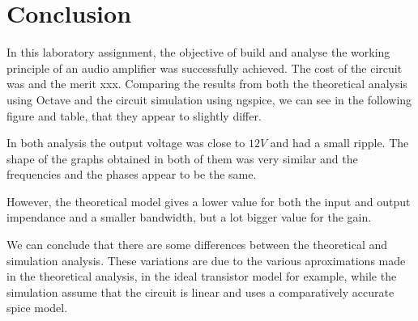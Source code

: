 \section{Conclusion}
\label{sec:conclusion}
In this laboratory assignment, the objective of build and analyse the working principle of an audio amplifier was successfully achieved.
The cost of the circuit was  and the merit xxx.
Comparing the results from both the theoretical analysis using Octave and the circuit simulation using ngspice, we can see in the following figure and table, that they appear to slightly differ.

In both analysis the output voltage was close to $12 V$ and had a small ripple. The shape of the graphs obtained in both of them was very similar and the frequencies and the phases appear to be the same.

However, the theoretical model gives a lower value for both the input and output impendance and a smaller bandwidth, but a lot bigger value for the gain. 

We can conclude that there are some differences between the theoretical and simulation analysis. These variations are due to the various aproximations made in the theoretical analysis, in the ideal transistor model for example, while the simulation assume that the circuit is linear and uses a comparatively accurate spice model.  



